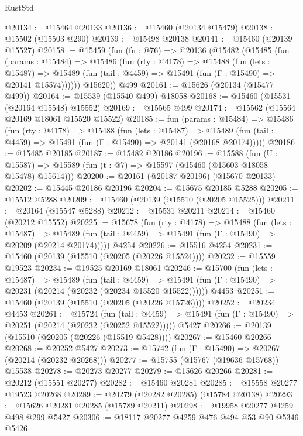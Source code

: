 \begin{lexlean}{RustStd}
\begin{coremodule}
@20134 := @15464 @20133
@20136 := @15460 (@20134 @15479)
@20138 := @15502 (@15503 @290)
@20139 := @15498 @20138
@20141 := @15460 (@20139 @15527)
@20158 := @15459
    (fun (fn : @76) =>
    @20136
      (@15482
        (@15485
          (fun (params : @15484) =>
          @15486
            (fun (rty : @4178) =>
            @15488
              (fun (lets : @15487) =>
              @15489 (fun (tail : @4459) => @15491 (fun (Γ : @15490) => @20141 @15574))))))
        @15620))
    @499
@20161 := @15626 (@20134 (@15477 @499))
@20164 := @15539 (@15540 @499) @18058
@20168 := @15460 (@15531 (@20164 @15548) @15552)
@20169 := @15565 @499
@20174 := @15562 (@15564 @20169 @18061 @15520 @15522)
@20185 := fun (params : @15484) =>
  @15486
    (fun (rty : @4178) =>
    @15488
      (fun (lets : @15487) =>
      @15489 (fun (tail : @4459) => @15491 (fun (Γ : @15490) => @20141 (@20168 @20174)))))
@20186 := @15485 @20185
@20187 := @15482 @20186
@20196 := @15588
    (fun (U : @15587) => @15589 (fun (t : @7) => @15597 (@15460 (@15603 @18058 @15478) @15614)))
@20200 := @20161 (@20187 @20196) (@15670 @20133)
@20202 := @15445 @20186 @20196
@20204 := @15675 @20185 @5288
@20205 := @15512 @5288
@20209 := @15460 (@20139 (@15510 (@20205 @15525)))
@20211 := @20164 (@15547 @5288)
@20212 := @15531 @20211
@20214 := @15460 (@20212 @15552)
@20225 := @15678
    (fun (rty : @4178) =>
    @15488
      (fun (lets : @15487) =>
      @15489 (fun (tail : @4459) => @15491 (fun (Γ : @15490) => @20209 (@20214 @20174)))))
    @4254
@20226 := @15516 @4254
@20231 := @15460 (@20139 (@15510 (@20205 (@20226 @15524))))
@20232 := @15559 @19523
@20234 := @19525 @20169 @18061
@20246 := @15700
    (fun (lets : @15487) =>
    @15489
      (fun (tail : @4459) =>
      @15491 (fun (Γ : @15490) => @20231 (@20214 (@20232 (@20234 @15520 @15522))))))
    @4453
@20251 := @15460 (@20139 (@15510 (@20205 (@20226 @15726))))
@20252 := @20234 @4453
@20261 := @15724
    (fun (tail : @4459) => @15491 (fun (Γ : @15490) => @20251 (@20214 (@20232 (@20252 @15522)))))
    @5427
@20266 := @20139 (@15510 (@20205 (@20226 (@15519 @5428))))
@20267 := @15460 @20266
@20268 := @20252 @5427
@20273 := @15742 (fun (Γ : @15490) => @20267 (@20214 (@20232 @20268)))
@20277 := @15755 (@15767 (@19636 @15768)) @15538
@20278 := @20273 @20277
@20279 := @15626 @20266
@20281 := @20212 (@15551 @20277)
@20282 := @15460 @20281
@20285 := @15558 @20277 @19523 @20268
@20289 := @20279 (@20282 @20285) (@15784 @20138)
@20293 := @15626 @20281 @20285 (@15789 @20211)
@20298 := @19958 @20277 @4259 @498 @299 @5427
@20306 := @18117 @20277 @4259 @476 @494 @53 @90 @5346 @5426

\end{coremodule}
\end{lexlean}
